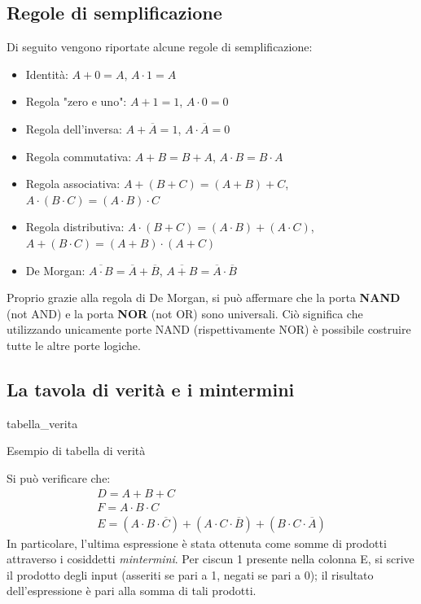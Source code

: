 \documentclass[class=book, crop=false]{standalone}
\begin{document}
\subsection{Regole di semplificazione}
\label{subsec:semplificazione}
Di seguito vengono riportate alcune regole di semplificazione:
\begin{itemize}
	\item Identità: \(A+0=A\), \(A\cdot 1=A\)
	\item Regola "zero e uno": \(A+1=1\), \(A\cdot 0=0\)
	\item Regola dell'inversa: \(A+\overline{A}=1\), \(A\cdot\overline{A}=0\)
	\item Regola commutativa: \(A+B=B+A\), \(A\cdot B=B\cdot A\)
	\item Regola associativa: \(A+(B+C)=(A+B)+C\), \(A\cdot(B\cdot C)=(A\cdot B)\cdot C\)
	\item Regola distributiva: \(A\cdot(B+C)=(A\cdot B)+(A\cdot C)\), \(A+(B\cdot C)=(A+B)\cdot(A+C)\)
	\item De Morgan: \(\overline{A\cdot B} = \overline{A}+\overline{B}\), \(\overline{A+B} = \overline{A}\cdot\overline{B}\)
\end{itemize}
Proprio grazie alla regola di De Morgan, si può affermare che la porta \textbf{NAND} (not AND) e la porta \textbf{NOR} (not OR) sono universali. Ciò significa che utilizzando unicamente porte NAND (rispettivamente NOR) è possibile costruire tutte le altre porte logiche.
\subsection{La tavola di verità e i mintermini}
\label{subsec:mintermini}
\begin{table}[!h]
	\centering
	{tabella_verita}
	\caption{Esempio di tabella di verità}
	\label{tabella-verita}
\end{table}
Si può verificare che:
\begin{gather*}
D = A+B+C\\
F = A\cdot B\cdot C\\
E = (A\cdot B\cdot\overline{C}) + (A\cdot C\cdot\overline{B}) + (B\cdot C\cdot\overline{A})
\end{gather*}
In particolare, l'ultima espressione è stata ottenuta come somme di prodotti attraverso i cosiddetti \emph{mintermini}. Per ciscun 1 presente nella colonna E, si scrive il prodotto degli input (asseriti se pari a 1, negati se pari a 0); il risultato dell'espressione è pari alla somma di tali prodotti.
\end{document}
